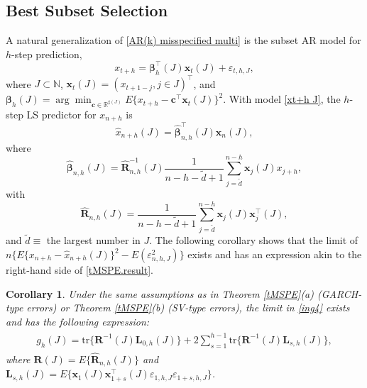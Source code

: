 \documentclass[ejsv2]{imsart}
\theoremstyle{plain}
\newtheorem{corollary}{Corollary}[section]
\theoremstyle{definition}
\theoremstyle{remark}
\begin{document}
\subsection{Best Subset Selection}\label{sec:3.2}
A natural generalization of \eqref{AR(k) misspecified multi} is the subset AR model for $h$-step prediction,
\begin{equation}\label{xt+h J}
x_{t+h}=\bm{\beta}_h^\top(J)\mathbf{x}_{t}(J)+\varepsilon_{t,h,J},
\end{equation}
where $J\subset\mathbb{N}$, $\mathbf{x}_{t}(J)=(x_{t+1-j},j\in J)^\top$, and
$\bm{\beta}_h(J)=\arg\min_{\mathbf{c}\in\mathbb{R}^{\sharp(J)}}E\{x_{t+h}-\mathbf{c}^\top\mathbf{x}_{t}(J)\}^2$. 
With model \eqref{xt+h J}, the $h$-step LS predictor
for $x_{n+h}$ is
\begin{equation}\label{hat xn+h J}
\hat{x}_{n+h}(J)=\hat{\bm{\beta}}_{n,h}^\top(J)\mathbf{x}_n(J),
\end{equation}
where
\begin{equation*}%
\hat{\bm{\beta}}_{n,h}(J)=\hat{\mathbf{R}}^{-1}_{n,h}(J)\frac{1}{n-h-\tilde{d}+1}\sum_{j=\tilde{d}}^{n-h}\mathbf{x}_j(J)x_{j+h},
\end{equation*}
with
\begin{equation*}%
\hat{\mathbf{R}}_{n,h}(J)=\frac{1}{n-h-\tilde{d}+1}\sum_{j=\tilde{d}}^{n-h}\mathbf{x}_j(J)\mathbf{x}^\top_j(J),
\end{equation*}
and  $\tilde{d} \equiv$ the largest number in $J$.
The following
corollary shows that
the limit of 
$
n\{E\{x_{n+h}-\hat{x}_{n+h}(J)\}^2-E(\varepsilon_{n,h,J}^2)\}$
exists and has an expression 
akin to the right-hand side of
\eqref{tMSPE.result}.




\begin{corollary}\label{cor subset}
Under the same assumptions as in Theorem \ref{tMSPE}(a) (GARCH-type errors) or Theorem \ref{tMSPE}(b) (SV-type errors),
the limit in \eqref{ing4} exists and has the following expression:
\begin{align}\label{cor subset.1}
\begin{split}
g_{h}(J)=\mathrm{tr}\{\mathbf{R}^{-1}(J)\mathbf{L}_{0,h}(J)\}+2\sum_{s=1}^{h-1}\mathrm{tr}\{\mathbf{R}^{-1}(J)\mathbf{L}_{s,h}(J)\},
\end{split}
\end{align}
where
$\mathbf{R}(J)=E\{\hat{\mathbf{R}}_{n,h}(J)\}$ and $\mathbf{L}_{s,h}(J)=E\{\mathbf{x}_{1}(J)\mathbf{x}_{1+s}^\top(J)\varepsilon_{1,h,J}\varepsilon_{1+s,h,J}\}$.
\end{corollary}
\end{document}
